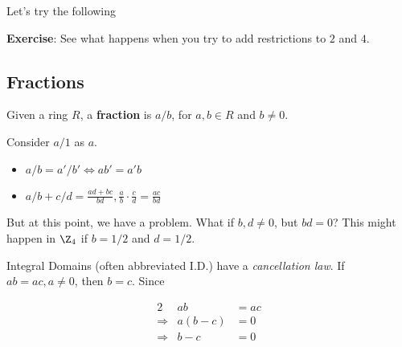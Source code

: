 \documentclass[12pt]{article}
\begin{document}
Let's try the following


{\bf Exercise}: See what happens when you try to add restrictions to $2$ and
$4$.

\subsection{Fractions}

Given a ring $R$, a {\bf fraction} is $a / b$, for $a, b \in R$ and $b \ne 0$.

Consider $a / 1$ as $a$.

\begin{itemize}
  \item $a / b = a' / b' \Leftrightarrow ab' = a'b$
  \item $a / b + c / d = \frac{ad + bc}{bd}, \frac{a}{b} \cdot \frac{c}{d} =
    \frac{ac}{bd}$
\end{itemize}

But at this point, we have a problem. What if $b, d \ne 0$, but $bd = 0$? This
might happen in $\Z_4$ if $b = 1/2$ and $d = 1/2$.



Integral Domains (often abbreviated I.D.) have a {\it cancellation law}. If $ab
=ac, a \ne 0$, then $b = c$. Since

\begin{alignat*}{2}
  &ab &= ac \\
  \Rightarrow&a(b - c) &= 0 \\
  \Rightarrow&b - c &= 0 \\
\end{alignat*}
\end{document}
